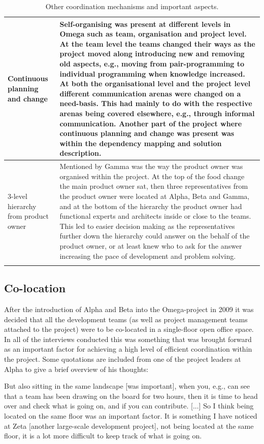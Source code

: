 \begin{center}
\begin{longtable}{| p{6cm} | p{9cm} |}
    Continuous planning and change & Self-organising was present at different levels in Omega such as team, organisation and project level. At the team level the teams changed their ways as the project moved along introducing new and removing old aspects, e.g., moving from pair-programming to individual programming when knowledge increased. At both the organisational level and the project level different communication arenas were changed on a need-basis. This had mainly to do with the respective arenas being covered elsewhere, e.g., through informal communication. Another part of the project where continuous planning and change was present was within the dependency mapping and solution description. \\ \hline
    3-level hierarchy from product owner & Mentioned by Gamma was the way the product owner was organised within the project. At the top of the food change the main product owner sat, then three representatives from the product owner were located at Alpha, Beta and Gamma, and at the bottom of the hierarchy the product owner had functional experts and architects inside or close to the teams. This led to easier decision making as the representatives further down the hierarchy could answer on the behalf of the product owner, or at least knew who to ask for the answer increasing the pace of development and problem solving. \\ \hline

    \caption{Other coordination mechanisms and important aspects.}
    \label{ocmaia}
    \end{longtable}
\end{center}

\subsection{Co-location}

After the introduction of Alpha and Beta into the Omega-project in 2009 it was decided that all the development teams (as well as project management teams attached to the project) were to be co-located in a single-floor open office space. In all of the interviews conducted this was something that was brought forward as an important factor for achieving a high level of efficient coordination within the project. Some quotations are included from one of the project leaders at Alpha to give a brief overview of his thoughts:

\begin{fancyquotes}
But also sitting in the same landscape [was important], when you, e.g., can see that a team has been drawing on the board for two hours, then it is time to head over and check what is going on, and if you can contribute. [...] So I think being located on the same floor was an important factor. It is something I have noticed at Zeta [another large-scale development project], not being located at the same floor, it is a lot more difficult to keep track of what is going on. 
\end{fancyquotes}

